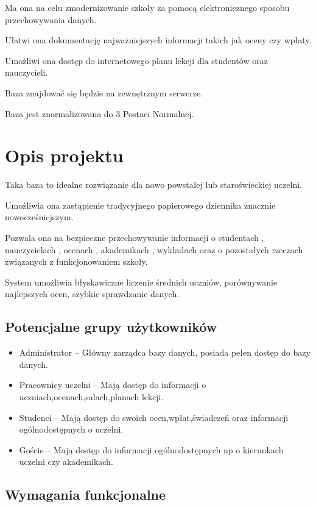\documentclass[12pt,a4paper]{article}
\begin{document}
Ma ona na celu zmodernizowanie szkoły za pomocą elektronicznego sposobu przechowywania danych.

Ułatwi ona dokumentację najważniejszych informacji takich jak oceny czy wpłaty.

Umożliwi ona dostęp do internetowego planu lekcji dla studentów oraz nauczycieli.

Baza znajdować się będzie na zewnętrznym serwerze.

Baza jest znormalizowana do 3 Postaci Normalnej.

\section{Opis projektu}
\label{sec:Project}

Taka baza to idealne rozwiązanie dla nowo powstałej lub staroświeckiej uczelni.

Umożliwia ona zastąpienie tradycyjnego papierowego dziennika znacznie nowocześniejszym.

Pozwala ona na bezpieczne przechowywanie informacji o studentach , nauczycielach , ocenach , akademikach , wykładach oraz o pozostałych rzeczach związanych z funkcjonowaniem szkoły.

System umożliwia błyskawiczne liczenie średnich uczniów, porównywanie najlepszych ocen, szybkie sprawdzanie danych.

\subsection{Potencjalne grupy użytkowników}
\label{sec:Users}

\begin{itemize}
	\item Administrator – Główny zarządca bazy danych, posiada pełen dostęp do bazy danych.
	\item Pracownicy uczelni – Mają dostęp do informacji o uczniach,ocenach,salach,planach lekcji.
	\item Studenci – Mają dostęp do swoich ocen,wpłat,świadczeń oraz informacji ogólnodostępnych o uczelni.
	\item Goście – Mają dostęp do informacji ogólnodostępnych np o kierunkach uczelni czy akademikach.
\end{itemize}

\newpage
\subsection{Wymagania funkcjonalne}
\label{sec:FunctionalConditions}
\end{document}
